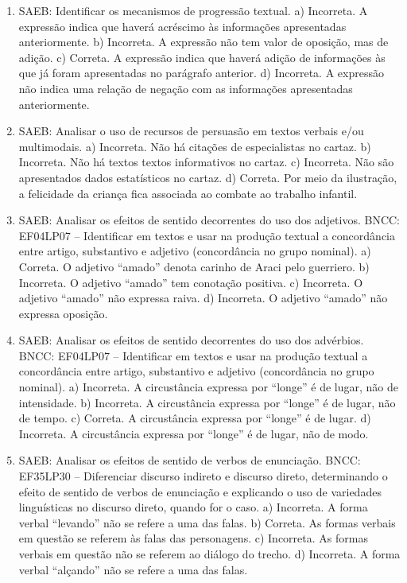 \begin{enumerate}
\item
SAEB: Identificar os mecanismos de progressão textual. a) Incorreta. A expressão indica que haverá acréscimo às informações apresentadas anteriormente. b) Incorreta. A expressão não tem valor de oposição, mas de adição. c) Correta. A expressão indica que haverá adição de informações às que já foram apresentadas no parágrafo anterior. d) Incorreta. A expressão não indica uma relação de negação com as informações apresentadas anteriormente.

\item
SAEB: Analisar o uso de recursos de persuasão em textos verbais e/ou multimodais. a) Incorreta. Não há citações de especialistas no cartaz. b) Incorreta. Não há textos textos informativos no cartaz. c) Incorreta. Não são apresentados dados estatísticos no cartaz. d) Correta. Por meio da ilustração, a felicidade da criança fica associada ao combate ao trabalho infantil.

\item
SAEB: Analisar os efeitos de sentido decorrentes do uso dos adjetivos. BNCC: EF04LP07 -- Identificar em textos e usar na produção textual a concordância entre artigo, substantivo e adjetivo (concordância no grupo nominal). a) Correta. O adjetivo ``amado'' denota carinho de Araci pelo guerriero. b) Incorreta. O adjetivo ``amado'' tem conotação positiva. c) Incorreta. O adjetivo ``amado'' não expressa raiva. d) Incorreta. O adjetivo ``amado'' não expressa oposição.

\item
SAEB: Analisar os efeitos de sentido decorrentes do uso dos advérbios. BNCC: EF04LP07 -- Identificar em textos e usar na produção textual a concordância entre artigo, substantivo e adjetivo (concordância no grupo nominal). a) Incorreta. A circustância expressa por ``longe'' é de lugar, não de intensidade. b) Incorreta. A circustância expressa por ``longe'' é de lugar, não de tempo. c) Correta.  A circustância expressa por ``longe'' é de lugar. d) Incorreta. A circustância expressa por ``longe'' é de lugar, não de modo.

\item
SAEB: Analisar os efeitos de sentido de verbos de enunciação. BNCC: EF35LP30 -- Diferenciar discurso indireto e discurso direto, determinando o efeito de sentido de verbos de enunciação e explicando o uso de variedades linguísticas no discurso direto, quando for o caso. a) Incorreta. A forma verbal ``levando'' não se refere a uma das falas. b) Correta. As formas verbais em questão se referem às falas das personagens. c) Incorreta. As formas verbais em questão não se referem ao diálogo do trecho. d) Incorreta. A forma verbal  ``alçando'' não se refere a uma das falas.


\end{enumerate}
